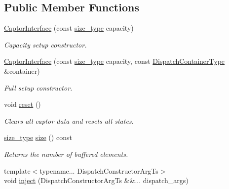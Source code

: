 \subsection*{Public Member Functions}
\begin{DoxyCompactItemize}
\item 
\hyperlink{classflow_1_1_captor_interface_a338790affab83521d1afdfa57df616dd}{Captor\+Interface} (const \hyperlink{classflow_1_1_captor_interface_a62db6a158eebcb377e63ede6a1f1a8c6}{size\+\_\+type} capacity)
\begin{DoxyCompactList}\small\item\em Capacity setup constructor. \end{DoxyCompactList}\item 
\hyperlink{classflow_1_1_captor_interface_aa94b6265974c0a432a8a2f5fafe35184}{Captor\+Interface} (const \hyperlink{classflow_1_1_captor_interface_a62db6a158eebcb377e63ede6a1f1a8c6}{size\+\_\+type} capacity, const \hyperlink{classflow_1_1_captor_interface_a887171bf3b12d8232922a81844ea9a7d}{Dispatch\+Container\+Type} \&container)
\begin{DoxyCompactList}\small\item\em Full setup constructor. \end{DoxyCompactList}\item 
\mbox{\label{classflow_1_1_captor_interface_a78be2f5226c40ef04347d095548b8607}} 
void \hyperlink{classflow_1_1_captor_interface_a78be2f5226c40ef04347d095548b8607}{reset} ()
\begin{DoxyCompactList}\small\item\em Clears all captor data and resets all states. \end{DoxyCompactList}\item 
\mbox{\label{classflow_1_1_captor_interface_a1a4b3f7f6c1bd16a2cb672d90a1cbbc0}} 
\hyperlink{classflow_1_1_captor_interface_a62db6a158eebcb377e63ede6a1f1a8c6}{size\+\_\+type} \hyperlink{classflow_1_1_captor_interface_a1a4b3f7f6c1bd16a2cb672d90a1cbbc0}{size} () const
\begin{DoxyCompactList}\small\item\em Returns the number of buffered elements. \end{DoxyCompactList}\item 
{\footnotesize template$<$typename... Dispatch\+Constructor\+Arg\+Ts$>$ }\\void \hyperlink{classflow_1_1_captor_interface_a2a7e884dff7564478a6ae060b37351f0}{inject} (Dispatch\+Constructor\+Arg\+Ts \&\&... dispatch\+\_\+args)

\end{DoxyCompactItemize}
